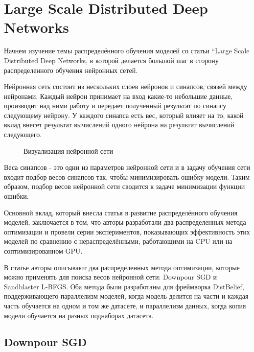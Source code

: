 
\section{Large Scale Distributed Deep Networks}
Начнем изучение темы распределённого обучения моделей со статьи “Large Scale Distributed Deep Networks\cite{beginning}, в которой делается большой шаг в сторону распределенного обучения нейронных сетей. 

Нейронная сеть состоит из нескольких слоев нейронов и синапсов, связей между нейронами. Каждый нейрон принимает на вход какие-то небольшие данные, производит над ними работу и передает полученный результат по синапсу следующему нейрону. У каждого синапса есть вес, который влияет на то, какой вклад внесет результат вычислений одного нейрона на результат вычислений следующего. 


\begin{figure}[h]%
	\centering
	\caption{Визуализация нейронной сети}
	\label{framework} %
\end{figure}

Веса синапсов - это одни из параметров нейронной сети и в задачу обучения сети входит подбор весов синапсов так, чтобы минимизировать ошибку модели. Таким образом, подбор весов нейронной сети сводится к задаче минимизации функции ошибки.

Основной вклад, который внесла статья в развитие распределённого обучения моделей, заключается в том, что авторы разработали два распределенных метода оптимизации и провели серии экспериментов, показывающих эффективность этих моделей по сравнению с нераспределёнными, работающими на CPU или на соптимизированном GPU.

В статье авторы описывают два распределенных метода оптимизации, которые можно применять для поиска весов нейронной сети: Downpour SGD и Sandblaster L-BFGS. Оба метода были разработаны для фреймворка DistBelief, поддерживающего параллелизм моделей, когда модель делится на части и каждая часть обучается на одном и том же датасете, и параллелизм данных, когда копия модели обучается на разных поднаборах датасета. 

\subsection{Downpour SGD}

